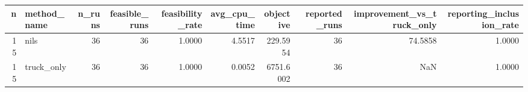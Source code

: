 \begin{tabular}{rlrrrrrrrr}
\toprule
n & method_name & n_runs & feasible_runs & feasibility_rate & avg_cpu_time & objective & reported_runs & improvement_vs_truck_only & reporting_inclusion_rate \\
\midrule
15 & nils & 36 & 36 & 1.0000 & 4.5517 & 229.5954 & 36 & 74.5858 & 1.0000 \\
15 & truck_only & 36 & 36 & 1.0000 & 0.0052 & 6751.6002 & 36 & NaN & 1.0000 \\
\bottomrule
\end{tabular}
